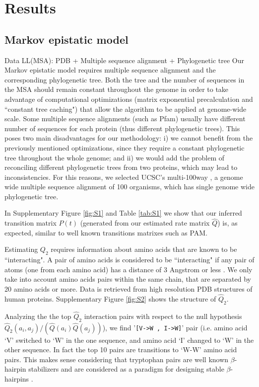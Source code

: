 \section{Results}

\subsection{Markov epistatic model}

Data LL(MSA): PDB + Multiple sequence alignment + Phylogenetic tree
Our Markov epistatic model requires multiple sequence alignment and the corresponding phylogenetic tree. Both the tree and the number of sequences in the MSA should remain constant throughout the genome in order to take advantage of computational optimizations (matrix exponential precalculation and ``constant tree caching") that allow the algorithm to be applied at genome-wide scale. Some multiple sequence alignments (such as Pfam) usually have different number of sequences for each protein (thus different phylogenetic trees). This poses two main disadvantages for our methodology: i) we cannot benefit from the previously mentioned optimizations, since they require a constant phylogenetic tree throughout the whole genome; and ii) we would add the problem of reconciling different phylogenetic trees from two proteins, which may lead to inconsistencies. For this reasons, we selected UCSC’s multi-100way \cite{REF}, a genome wide multiple sequence alignment of 100 organisms, which has single genome wide phylogenetic tree.

In Supplementary Figure \ref{fig:S1} and Table \ref{tab:S1} we show that our inferred transition matrix $P(t)$ (generated from our estimated rate matrix $\hat{Q}$) is, as expected, similar to well known transitions matrixes such as PAM.

Estimating $Q_2$ requires information about amino acids that are known to be ``interacting". A pair of amino acids is considered to be ``interacting" if any pair of atoms (one from each amino acid) has a distance of 3 Angstrom or less \cite{REF}. We only take into account amino acids pairs within the same chain, that are separated by 20 amino acids or more. Data is retrieved from high resolution PDB structures of human proteins. Supplementary Figure \ref{fig:S2} shows the structure of $\hat{Q}_2$.

Analyzing the the top $\hat{Q}_2$ interaction pairs with respect to the null hypothesis $\hat{Q}_2(a_i, a_j) / (\hat{Q}(a_i) \hat{Q}(a_j)) $), we find '\texttt{[V->W ,  I->W]}' pair (i.e. amino acid ‘V’ switched to ‘W’ in the one sequence, and amino acid ‘I’ changed to ‘W’ in the other sequence. In fact the top 10 pairs are transitions to ‘W-W’ amino acid pairs. This makes sense considering that tryptophan pairs are well known $\beta$-hairpin stabilizers and are considered as a paradigm for designing stable $\beta$-hairpins \cite{Santiveri2010}.

